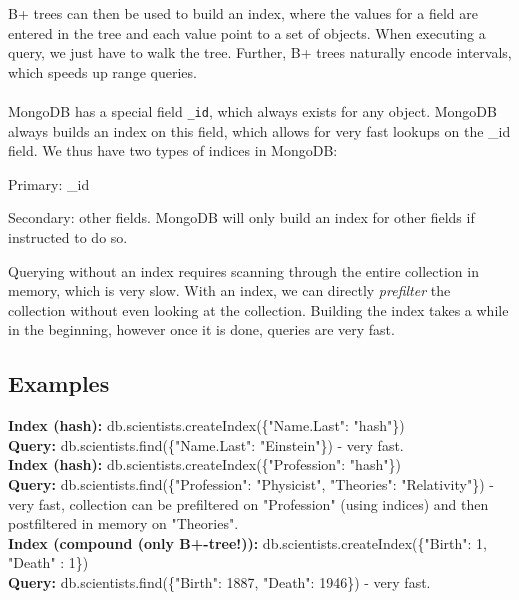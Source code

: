 \documentclass[11pt,oneside,a4paper]{article}
\begin{document}
B+ trees can then be used to build an index, where the values for a field are entered in the tree and each value point to a set of objects. When executing a query, we just have to walk the tree. Further, B+ trees naturally encode intervals, which speeds up range queries.\\\\


MongoDB has a special field \texttt{\_id}, which always exists for any object. MongoDB always builds an index on this field, which allows for very fast lookups on the \_id field. We thus have two types of indices in MongoDB:

\begin{compactitem}
\item Primary: \_id
\item Secondary: other fields. MongoDB will only build an index for other fields if instructed to do so.
\end{compactitem}

Querying without an index requires scanning through the entire collection in memory, which is very slow. With an index, we can directly \textit{prefilter} the collection without even looking at the collection. Building the index takes a while in the beginning, however once it is done, queries are very fast.\\

\subsection{Examples}

\textbf{Index (hash):} db.scientists.createIndex(\{"Name.Last": "hash"\})\\
\textbf{Query:} db.scientists.find(\{"Name.Last": "Einstein"\}) - very fast.\\

\textbf{Index (hash):} db.scientists.createIndex(\{"Profession": "hash"\})\\
\textbf{Query:} db.scientists.find(\{"Profession": "Physicist", "Theories": "Relativity"\}) - very fast, collection can be prefiltered on "Profession" (using indices) and then postfiltered in memory on "Theories".\\

\textbf{Index (compound (only B+-tree!)):} db.scientists.createIndex(\{"Birth": 1, "Death" : 1\})\\
\textbf{Query:} db.scientists.find(\{"Birth": 1887, "Death": 1946\}) - very fast.\\
\end{document}
